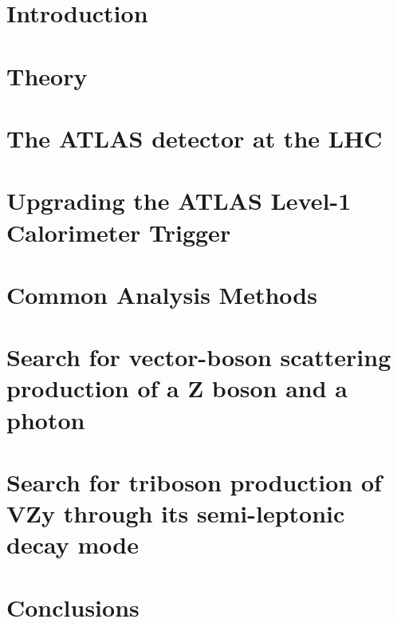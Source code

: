\newcommand\relpath[1]{#1}
\newcommand\inputchapter[1]{}
\newcommand\resource[1]{#1}
\chapter{Introduction}
\inputchapter{introduction}

\chapter{Theory}
\inputchapter{theory}

\chapter{The ATLAS detector at the \acl{LHC}}
\inputchapter{detector}

\chapter{Upgrading the ATLAS Level-1 Calorimeter Trigger}
\inputchapter{l1calo}

\chapter{Common Analysis Methods}
\inputchapter{analysis-common}

\chapter{Search for vector-boson scattering production of a Z boson and a photon}
\inputchapter{vbs}

\chapter{Search for triboson production of VZy through its semi-leptonic decay mode}
\inputchapter{vzy}

\chapter{Conclusions}
\inputchapter{conclusion}
